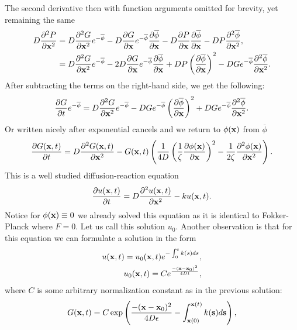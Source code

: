 The second derivative then with function arguments omitted for brevity, yet remaining the same
\begin{equation}
\begin{split}
    D\frac{\partial^2 P}{\partial \mathbf{x}^2} &= D\frac{\partial^2{G}}{{\partial \mathbf{x}^2}} e^{-\overline{\phi}} - D\frac{\partial{G}}{{\partial \mathbf{x}}} e^{-\overline{\phi}} \frac{\partial{\overline{\phi}}}{{\partial \mathbf{x}}} - D\frac{\partial{P}}{{\partial \mathbf{x}}} \frac{\partial{\overline{\phi}}}{{\partial \mathbf{x}}}
    - D P \frac{\partial^2{\overline{\phi}}}{{\partial \mathbf{x}^2}}, \\ &= D\frac{\partial^2{G}}{{\partial \mathbf{x}^2}} e^{-\overline{\phi}} - 2D \frac{\partial{G}}{{\partial \mathbf{x}}} e^{-\overline{\phi}} \frac{\partial{\overline{\phi}}}{{\partial \mathbf{x}}} + D P \left(\frac{\partial{\overline{\phi}}}{{\partial \mathbf{x}}}\right)^2
    - D G e^{-\overline{\phi}} \frac{\partial^2{\overline{\phi}}}{{\partial \mathbf{x}^2}}.
\end{split}
\end{equation}
After subtracting the terms on the right-hand side, we get the following:
\begin{equation}
    \begin{split}
        \frac{\partial G}{\partial t} e^{-\overline{\phi}} = D\frac{\partial^2{G}}{{\partial \mathbf{x}^2}} e^{-\overline{\phi}} - D G e^{-\overline{\phi}} \left(\frac{\partial{\overline{\phi}}}{{\partial \mathbf{x}}}\right)^2 + D G e^{-\overline{\phi}} \frac{\partial^2{\overline{\phi}}}{{\partial \mathbf{x}^2}}.
    \end{split}
\end{equation}
Or written nicely after exponential cancels and we return to $\phi(\mathbf{x})$ from $\overline{\phi}$
\begin{equation}
    \frac{\partial G(\mathbf{x},t)}{\partial t} = D \frac{\partial^2{G(\mathbf{x},t)}}{{\partial \mathbf{x}^2}} - G(\mathbf{x},t) \left( \frac{1}{4D} \left(\frac{1}{\zeta}\frac{\partial{\phi(\mathbf{x})}}{{\partial \mathbf{x}}} \right)^2 - \frac{1}{2 \zeta} \frac{\partial^2{\phi(\mathbf{x})}}{{\partial \mathbf{x}^2}} \right).
\end{equation}
This is a well studied diffusion-reaction equation
\begin{equation}
    \frac{\partial u(\mathbf{x},t)}{\partial t} = D \frac{\partial^2{u(\mathbf{x},t)}}{{\partial \mathbf{x}^2}} - k u(\mathbf{x},t).
\end{equation}
Notice for $\phi(\mathbf{x}) \equiv 0$ we already solved this equation as it is identical to Fokker-Planck where $F=0$. Let us call this solution $u_0$. Another observation is that for this equation we can formulate a solution in the form
\begin{equation}
\begin{split}
    u(\mathbf{x},t) = u_0(\mathbf{x},t) e^{-\int_0^t k(s) ds}, \\
    u_0(\mathbf{x}, t) = C e^{\frac{-( \mathbf{x} - \mathbf{x}_0)^2}{4 D t}},
\end{split}
\end{equation}
where $C$ is some arbitrary normalization constant as in the previous solution: 
\begin{equation}
    G(\mathbf{x},t) = C \exp \left( \frac{-( \mathbf{x} - \mathbf{x}_0)^2}{4 D \epsilon} -\int_{\mathbf{x}(0)}^{\mathbf{x}(t)}  k(\mathbf{s}) d\mathbf{s} \right),
\end{equation}
